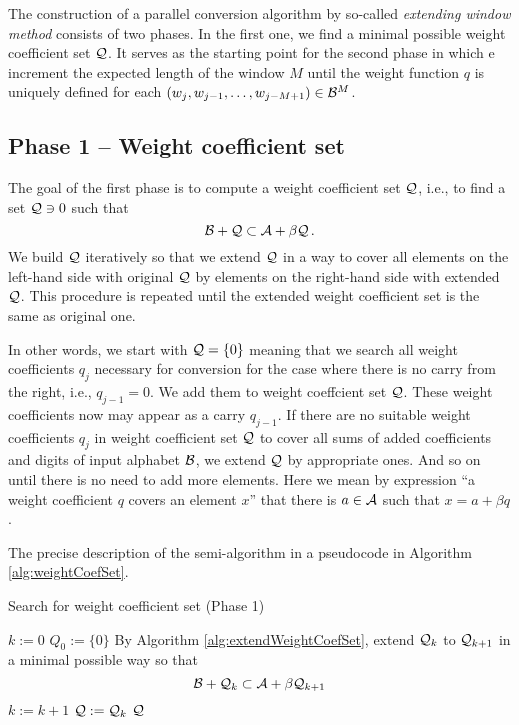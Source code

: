 The construction of a parallel conversion algorithm by so-called \emph{extending window method} consists of two phases. In the first one, we find a minimal possible weight coefficient set $\mathcal{Q}$. It serves as the starting point for the second phase in which e increment the expected length of the window $M$ until the weight function $q$ is uniquely defined for each $(w_j,w_{j-1}, \dots , w_{j-M+1}) \in \mathcal{B}^{M}$.

\subsection{Phase 1 -- Weight coefficient set}
The goal of the first phase is to compute a weight coefficient set $\mathcal{Q}$, i.e., to find a set $\mathcal{Q} \ni 0$ such that 
$$
    \mathcal{B} + \mathcal{Q} \subset \mathcal{A} + \beta \mathcal{Q}\,.
$$  
We build $\mathcal{Q}$ iteratively so that we extend $\mathcal{Q}$ in a way to cover all elements on the left-hand side with original $\mathcal{Q}$ by elements on the right-hand side with extended $\mathcal{Q}$. This procedure is repeated until the extended weight coefficient set is the same as original one. 

In other words, we start with $\mathcal{Q}=\{0\}$ meaning that we search all weight coefficients $q_j$ necessary for conversion for the case where there is no carry from the right, i.e., $q_{j-1}=0$. We add them to weight coeffcient set $\mathcal{Q}$. These weight coefficients now may appear as a carry $q_{j-1}$. If there are no suitable weight coefficients $q_j$ in weight coefficient set $\mathcal{Q}$ to cover all sums of added coefficients and digits of input alphabet $\mathcal{B}$, we extend $\mathcal{Q}$ by appropriate ones. And so on until there is no need to add more elements. Here we mean by expression ``a weight coefficient $q$ covers an element $x$'' that there is $a \in \mathcal{A}$ such that $x=a + \beta q$.
    
The precise description of the semi-algorithm in a pseudocode in Algorithm \ref{alg:weightCoefSet}.  
    
\begin{algorithm}
  \caption{Search for weight coefficient set (Phase 1)}
    \label{alg:weightCoefSet}
  \begin{algorithmic}[1]
    \STATE $k:=0$ 
    \STATE $Q_0:=\{0\}$
    \REPEAT
     \STATE  By Algorithm \ref{alg:extendWeightCoefSet}, extend $\mathcal{Q}_k$ to $\mathcal{Q}_{k+1}$ in a minimal possible way so that $$\mathcal{B}+ \mathcal{Q}_k \subset \mathcal{A} + \beta \mathcal{Q}_{k+1}$$
     \vspace{-20pt}
      \STATE  $k:=k+1$
      \STATE $\mathcal{Q}:=\mathcal{Q}_k$
    \RETURN $\mathcal{Q}$
  \end{algorithmic}
\end{algorithm}

